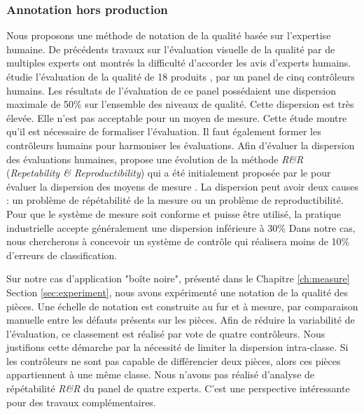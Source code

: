 \subsubsection{Annotation hors production} \label{parag:offline_annotation}
Nous proposons une méthode de notation de la qualité basée sur l'expertise humaine.
De précédents travaux sur l'évaluation visuelle de la qualité par de multiples experts ont montrés la difficulté d'accorder les avis d'experts humains.
\citeauthor{baudet_visual_2011} étudie l'évaluation de la qualité de 18 produits \cite{baudet_visual_2011}, par un panel de cinq contrôleurs humains.
Les résultats de l'évaluation de ce panel possédaient une dispersion maximale de 50\% sur l'ensemble des niveaux de qualité.
Cette dispersion est très élevée.
Elle n'est pas acceptable pour un moyen de mesure.
Cette étude montre qu'il est nécessaire de formaliser l'évaluation.
Il faut également former les contrôleurs humains pour harmoniser les évaluations.
Afin d'évaluer la dispersion des évaluations humaines,  \citeauthor{baudet_maitrise_2012} \cite{baudet_maitrise_2012} propose une évolution de la méthode \textit{R\&R} (\textit{Repetability \& Reproductibility}) qui a été initialement proposée par le \citeauthor{automotiveindustryactiongroup_measurement_2010} pour évaluer la dispersion des moyens de mesure \cite{automotiveindustryactiongroup_measurement_2010}.
La dispersion peut avoir deux causes : un problème de répétabilité de la mesure ou un problème de reproductibilité.
Pour que le système de mesure soit conforme et puisse être utilisé, la pratique industrielle accepte généralement une dispersion inférieure à 30\%
Dans notre cas, nous chercherons à concevoir un système de contrôle qui réalisera moins de 10\% d'erreurs de classification.

Sur notre cas d'application "boîte noire", présenté dans le Chapitre \ref{ch:measure} Section \ref{sec:experiment}, nous avons expérimenté une notation de la qualité des pièces.
Une échelle de notation est construite au fur et à mesure, par comparaison manuelle entre les défauts présents sur les pièces.
Afin de réduire la variabilité de l'évaluation, ce classement est réalisé par vote de quatre contrôleurs.
Nous justifions cette démarche par la nécessité de limiter la dispersion intra-classe.
Si les contrôleurs ne sont pas capable de différencier deux pièces, alors ces pièces appartiennent à une même classe.
Nous n'avons pas réalisé d'analyse de répétabilité \textit{R\&R} du panel de quatre experts.
C'est une perspective intéressante pour des travaux complémentaires.

